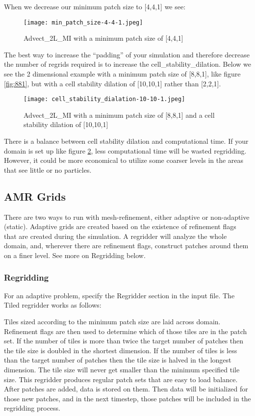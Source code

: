 When we decrease our minimum patch size to [4,4,1] we see:
\begin{figure}[H]
  \centering
  \texttt{[image: min\_patch\_size-4-4-1.jpeg]}
  \caption{Advect\_2L\_MI with a minimum patch size of [4,4,1]}
  \label{fig:441}
\end{figure}

The best way to increase the ``padding'' of your simulation and therefore decrease the number of regrids required is to increase the cell\_stability\_dilation. Below we see the 2 dimensional example with a minimum patch size of [8,8,1], like figure \ref{fig:881}, but with a cell stability dilation of [10,10,1] rather than [2,2,1].

\begin{figure}[H]
  \centering
  \texttt{[image: cell\_stability\_dialation-10-10-1.jpeg]}
  \caption{Advect\_2L\_MI with a minimum patch size of [8,8,1] and a cell stability dilation of [10,10,1]}
  \label{fig:10101}
\end{figure}

There is a balance between cell stability dilation and computational time. If your domain is set up like figure \ref{fig:10101}, less computational time will be wasted regridding. However, it could be more economical to utilize some coarser levels in the areas that see little or no particles.


\subsection{AMR Grids}


There are two ways to run with mesh-refinement, either adaptive or
non-adaptive (static). Adaptive grids are created based on the
existence of refinement flags that are created during the
simulation. A regridder will analyze the whole domain, and, wherever there are
refinement flags, construct patches around them on a finer
level. See more on Regridding below.

\subsubsection{Regridding}


For an adaptive problem, specify the Regridder section in the input
file. The Tiled regridder works as follows:

Tiles sized according to the minimum patch size are laid across domain. Refinement flags are then used to determine which of
those tiles are in the patch set. If the number of tiles is more than
twice the target number of patches then the tile size is doubled in
the shortest dimension. If the number of tiles is less than the target
number of patches then the tile size is halved in the longest
dimension. The tile size will never get smaller than the minimum
specified tile size. This regridder produces regular patch sets that
are easy to load balance. After patches are added, data is stored on them. Then data will be
initialized for those new patches, and in the next timestep, those
patches will be included in the regridding process.

